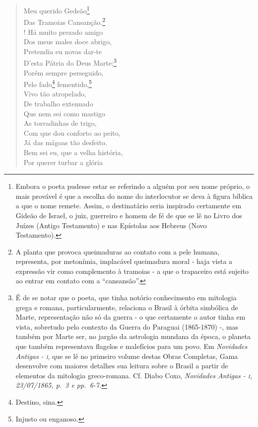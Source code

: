 \begin{verse}
Meu querido Gedeão\footnote{ Embora o poeta pudesse estar se
  referindo a alguém por seu nome próprio, o mais provável é que a
  escolha do nome do interlocutor se deva à figura bíblica a que o nome
  remete. Assim, o destinatário seria inspirado certamente em Gideão de
  Israel, o juiz, guerreiro e homem de fé de que se lê no Livro dos
  Juízes (Antigo Testamento) e nas Epístolas aos Hebreus (Novo
  Testamento).}\\
Das Tramoias Cansanção.\footnote{ A planta que provoca queimaduras ao
  contato com a pele humana, representa, por metonímia, implacável
  queimadura moral - haja vista a expressão vir como complemento à
  tramoias - a que o trapaceiro está sujeito ao entrar em contato com a
  ``cansansão''.}\\!
Há muito prezado amigo\\
Dos meus males doce abrigo,\\
Pretendia eu novas dar-te\\
D'esta Pátria do Deus Marte;\footnote{ É de se notar que o poeta, que
  tinha notório conhecimento em mitologia grega e romana,
  particularmente, relaciona o Brasil à órbita simbólica de Marte,
  representação não só da guerra - o que certamente o autor tinha em
  vista, sobretudo pelo contexto da Guerra do Paraguai (1865-1870) -,
  mas também por Marte ser, no jargão da astrologia mundana da época, o
  planeta que também representava flagelos e malefícios para um povo. Em
  \emph{Novidades Antigas - \textsc{i}}, que se lê no primeiro volume destas
  Obras Completas, Gama desenvolve com maiores detalhes sua leitura
  sobre o Brasil a partir de elementos da mitologia greco-romana. Cf.
  Diabo Coxo, \emph{Novidades Antigas - \textsc{i}, 23/07/1865, p.~3 e pp.~6-7.}}\\
Porém sempre perseguido,\\
Pelo fado\footnote{ Destino, sina.} fementido,\footnote{ Injusto
  ou enganoso.}\\
Vivo tão atropelado,\\
De trabalho extenuado\\
Que nem sei como mastigo\\
As torradinhas de trigo,\\
Com que dou conforto ao peito,\\
Já das mágoas tão desfeito.\\
Bem sei eu, que a velha história,\\
Por querer turbar a glória\\

\end{verse}
